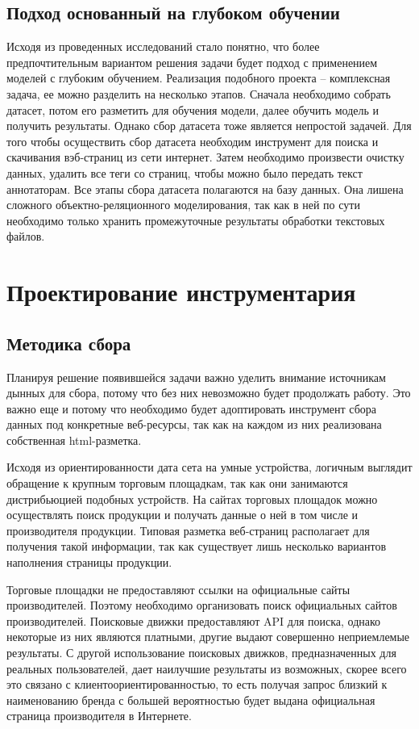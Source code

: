 \documentclass[../main]{subfiles}
\begin{document}
\subsection{Подход основанный на глубоком обучении}
Исходя из проведенных исследований стало понятно, что более предпочтительным вариантом решения задачи будет подход с применением моделей с глубоким обучением. Реализация подобного проекта -- комплексная задача, ее можно разделить на несколько этапов. Сначала необходимо собрать датасет, потом его разметить для обучения модели, далее обучить модель и получить результаты. Однако сбор датасета тоже является непростой задачей. Для того чтобы осуществить сбор датасета необходим инструмент для поиска и скачивания вэб-страниц из сети интернет. Затем необходимо произвести очистку данных, удалить все теги со страниц, чтобы можно было передать текст аннотаторам. Все этапы сбора датасета полагаются на базу данных. Она лишена сложного объектно-реляционного моделирования, так как в ней по сути необходимо только хранить промежуточные результаты обработки текстовых файлов.

\newpage
\section{Проектирование инструментария}

\subsection{Методика сбора}
Планируя решение появившейся задачи важно уделить внимание источникам дынных для сбора, потому что без них невозможно будет продолжать работу. Это важно еще и потому что необходимо будет адоптировать инструмент сбора данных под конкретные веб-ресурсы, так как на каждом из них реализована собственная html-разметка.

Исходя из ориентированности дата сета на умные устройства, логичным выглядит обращение к крупным торговым площадкам, так как они занимаются дистрибьюцией подобных устройств. На сайтах торговых площадок можно осуществлять поиск продукции и получать данные о ней в том числе и производителя продукции. Типовая разметка веб-страниц располагает для получения такой информации, так как существует лишь несколько вариантов наполнения страницы продукции.

Торговые площадки не предоставляют ссылки на официальные сайты производителей. Поэтому необходимо организовать поиск официальных сайтов производителей. Поисковые движки предоставляют API для поиска, однако некоторые из них являются платными, другие выдают совершенно неприемлемые результаты. С другой использование поисковых движков, предназначенных для реальных пользователей, дает наилучшие результаты из возможных, скорее всего это связано с клиентоориентированностью, то есть получая запрос близкий к наименованию бренда с большей вероятностью будет выдана официальная страница производителя в Интернете.
\end{document}
